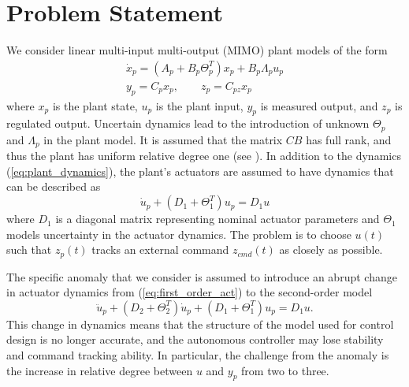 \documentclass[english]{ifacconf}
\begin{document}
\section{Problem Statement}\label{sec:problem}
We consider linear multi-input multi-output (MIMO) plant models of the form
\begin{equation}
\begin{gathered}
\dot x_p = (A_p + B_p \Theta_p^T) x_p + B_p \Lambda_p u_p \\
y_p = C_p x_p, \qquad z_p = C_{pz} x_p \label{eq:plant_dynamics}
\end{gathered}
\end{equation}
where $x_p$ is the plant state, $u_p$ is the plant input, $y_p$ is measured output, and $z_p$ is regulated output. Uncertain dynamics lead to the introduction of unknown $\Theta_p$ and $\Lambda_p$ in the plant model. It is assumed that the matrix $CB$ has full rank, and thus the plant has uniform relative degree one (see \cite{qu2016adaptive}). In addition to the dynamics (\ref{eq:plant_dynamics}), the plant's actuators are assumed to have dynamics that can be described as
\begin{equation}
	\dot{u}_p + (D_1 + \Theta_1^T) u_p = D_1 u \label{eq:first_order_act}
\end{equation}
where $D_1$ is a diagonal matrix representing nominal actuator parameters and $\Theta_1$ models uncertainty in the actuator dynamics. The problem is to choose $u(t)$ such that $z_p(t)$ tracks an external command $z_{cmd}(t)$ as closely as possible.

The specific anomaly that we consider is assumed to introduce an abrupt change in actuator dynamics from (\ref{eq:first_order_act}) to the second-order model
\begin{equation}
	\ddot{u}_p + (D_2 + \Theta_2^T) \dot{u}_p + (D_1 + \Theta_1^T) u_p = D_1 u. \label{eq:second_order_act}
\end{equation}
This change in dynamics means that the structure of the model used for control design is no longer accurate, and the autonomous controller may lose stability and command tracking ability. In particular, the challenge from the anomaly is the increase in relative degree between $u$ and $y_p$ from two to three.
\end{document}
